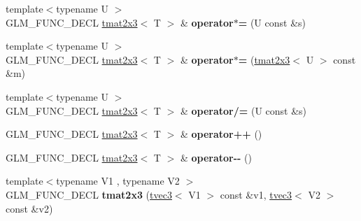\begin{DoxyCompactItemize}
\item 
\hypertarget{structglm_1_1detail_1_1tmat2x3_a91712d7228dd99c809c916409ad5fee0}{{\footnotesize template$<$typename U $>$ }\\\-G\-L\-M\-\_\-\-F\-U\-N\-C\-\_\-\-D\-E\-C\-L \hyperlink{structglm_1_1detail_1_1tmat2x3}{tmat2x3}$<$ \-T $>$ \& {\bfseries operator$\ast$=} (\-U const \&s)}\label{structglm_1_1detail_1_1tmat2x3_a91712d7228dd99c809c916409ad5fee0}

\item 
\hypertarget{structglm_1_1detail_1_1tmat2x3_a442b040fddea1c18a6f78fe1c1ab5923}{{\footnotesize template$<$typename U $>$ }\\\-G\-L\-M\-\_\-\-F\-U\-N\-C\-\_\-\-D\-E\-C\-L \hyperlink{structglm_1_1detail_1_1tmat2x3}{tmat2x3}$<$ \-T $>$ \& {\bfseries operator$\ast$=} (\hyperlink{structglm_1_1detail_1_1tmat2x3}{tmat2x3}$<$ \-U $>$ const \&m)}\label{structglm_1_1detail_1_1tmat2x3_a442b040fddea1c18a6f78fe1c1ab5923}

\item 
\hypertarget{structglm_1_1detail_1_1tmat2x3_a31ec9fb9effe915aef699f52a79cf16b}{{\footnotesize template$<$typename U $>$ }\\\-G\-L\-M\-\_\-\-F\-U\-N\-C\-\_\-\-D\-E\-C\-L \hyperlink{structglm_1_1detail_1_1tmat2x3}{tmat2x3}$<$ \-T $>$ \& {\bfseries operator/=} (\-U const \&s)}\label{structglm_1_1detail_1_1tmat2x3_a31ec9fb9effe915aef699f52a79cf16b}

\item 
\hypertarget{structglm_1_1detail_1_1tmat2x3_a871796f237c964f75c66db2ff7b107cf}{\-G\-L\-M\-\_\-\-F\-U\-N\-C\-\_\-\-D\-E\-C\-L \hyperlink{structglm_1_1detail_1_1tmat2x3}{tmat2x3}$<$ \-T $>$ \& {\bfseries operator++} ()}\label{structglm_1_1detail_1_1tmat2x3_a871796f237c964f75c66db2ff7b107cf}

\item 
\hypertarget{structglm_1_1detail_1_1tmat2x3_ab3ba2a1f3b1773fbd3c03aee24d47ece}{\-G\-L\-M\-\_\-\-F\-U\-N\-C\-\_\-\-D\-E\-C\-L \hyperlink{structglm_1_1detail_1_1tmat2x3}{tmat2x3}$<$ \-T $>$ \& {\bfseries operator-\/-\/} ()}\label{structglm_1_1detail_1_1tmat2x3_ab3ba2a1f3b1773fbd3c03aee24d47ece}

\item 
\hypertarget{structglm_1_1detail_1_1tmat2x3_a53c839191a496f91889b4aca31a2ab22}{{\footnotesize template$<$typename V1 , typename V2 $>$ }\\\-G\-L\-M\-\_\-\-F\-U\-N\-C\-\_\-\-D\-E\-C\-L {\bfseries tmat2x3} (\hyperlink{structglm_1_1detail_1_1tvec3}{tvec3}$<$ \-V1 $>$ const \&v1, \hyperlink{structglm_1_1detail_1_1tvec3}{tvec3}$<$ \-V2 $>$ const \&v2)}\label{structglm_1_1detail_1_1tmat2x3_a53c839191a496f91889b4aca31a2ab22}

\end{DoxyCompactItemize}
